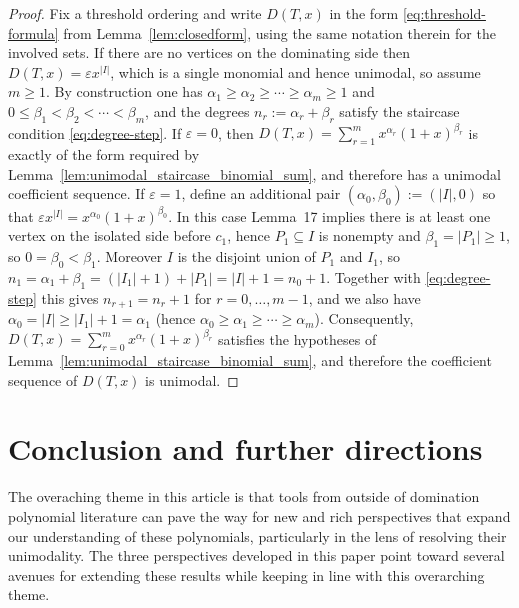 \documentclass[11pt]{amsart}
\numberwithin{equation}{section}
\begin{document}
\begin{proof}
Fix a threshold ordering and write $D(T,x)$ in the form \eqref{eq:threshold-formula} from Lemma~\ref{lem:closedform}, using the same notation therein for the involved sets. If there are no vertices on the dominating side then $D(T,x)=\varepsilon x^{|I|}$, which is a single monomial and hence unimodal, so assume $m\ge 1$. By construction one has $\alpha_1\ge\alpha_2\ge\cdots\ge\alpha_m\ge 1$ and $0\le \beta_1<\beta_2<\cdots<\beta_m$, and the degrees $n_r:=\alpha_r+\beta_r$ satisfy the staircase condition \eqref{eq:degree-step}. If $\varepsilon=0$, then $D(T,x)=\sum_{r=1}^{m} x^{\alpha_r}(1+x)^{\beta_r}$ is exactly of the form required by Lemma~\ref{lem:unimodal_staircase_binomial_sum}, and therefore has a unimodal coefficient sequence. If $\varepsilon=1$, define an additional pair $(\alpha_0,\beta_0):=(|I|,0)$ so that $\varepsilon x^{|I|}=x^{\alpha_0}(1+x)^{\beta_0}$. In this case Lemma~17 implies there is at least one vertex on the isolated side before $c_1$, hence $P_1\subseteq I$ is nonempty and $\beta_1=|P_1|\ge 1$, so $0=\beta_0<\beta_1$. Moreover $I$ is the disjoint union of $P_1$ and $I_1$, so $n_1=\alpha_1+\beta_1=(|I_1|+1)+|P_1|=|I|+1=n_0+1$. Together with \eqref{eq:degree-step} this gives $n_{r+1}=n_r+1$ for $r=0,\dots,m-1$, and we also have $\alpha_0=|I|\ge |I_1|+1=\alpha_1$ (hence $\alpha_0\ge\alpha_1\ge\cdots\ge\alpha_m$). Consequently, $D(T,x)=\sum_{r=0}^{m} x^{\alpha_r}(1+x)^{\beta_r}$ satisfies the hypotheses of Lemma~\ref{lem:unimodal_staircase_binomial_sum}, and therefore the coefficient sequence of $D(T,x)$ is unimodal.
\end{proof}

\section{Conclusion and further directions}

The overaching theme in this article is that tools from outside of domination polynomial literature can pave the way for new and rich perspectives that expand our understanding of these polynomials, particularly in the lens of resolving their unimodality. The three perspectives developed in this paper point toward several avenues for extending these results while keeping in line with this overarching theme.
\end{document}
